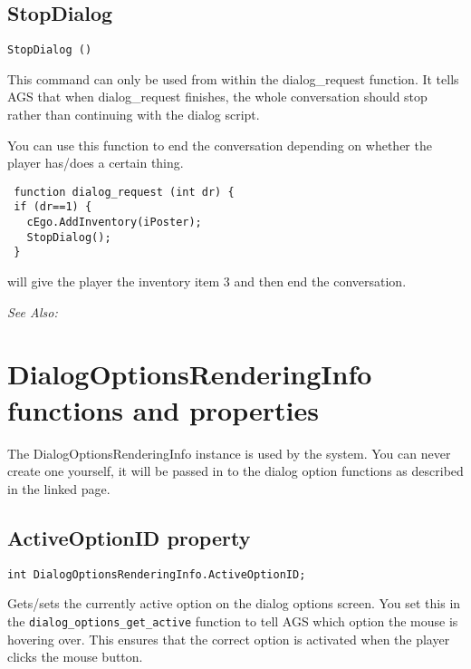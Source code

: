 \subsection{StopDialog}\label{StopDialog}%

\begin{verbatim}
StopDialog ()
\end{verbatim}
This command can only be used from within the dialog_request function. It
tells AGS that when dialog_request finishes, the whole conversation should
stop rather than continuing with the dialog script.

You can use this function to end the conversation depending on whether the
player has/does a certain thing.

\begin{verbatim}
 function dialog_request (int dr) {
 if (dr==1) {
   cEgo.AddInventory(iPoster);
   StopDialog();
 }
\end{verbatim}
will give the player the inventory item 3 and then end the conversation.

\it{See Also:} 



\section{DialogOptionsRenderingInfo functions and properties}\label{DialogOptionsRenderingInfoFunctions}%

The DialogOptionsRenderingInfo instance is used by the 
system. You can never create one yourself, it will be passed in to the dialog option functions as
described in the linked page.


\subsection{ActiveOptionID property}\label{DialogOptionsRenderingInfo.ActiveOptionID}%

\begin{verbatim}
int DialogOptionsRenderingInfo.ActiveOptionID;
\end{verbatim}
Gets/sets the currently active option on the dialog options screen. You set this in the
\verb$dialog_options_get_active$ function to tell AGS which option the mouse is hovering over.
This ensures that the correct option is activated when the player clicks the mouse button.

